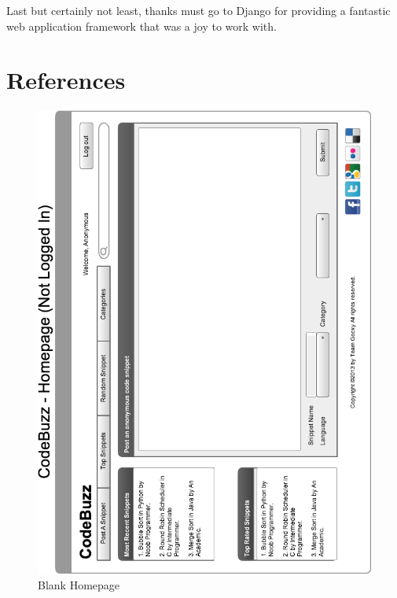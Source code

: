 \documentclass{sig-alt-release2}
\begin{document}
Last but certainly not least, thanks must go to Django for providing
a fantastic web application framework that was a joy to work with.
\section{References}

\begin{figure}
\includegraphics[width=\textwidth]{../imgs/InitialHomepageHorz.png}
\caption{Blank Homepage}
\label{fig:blankPage}
\end{figure}
\end{document}
